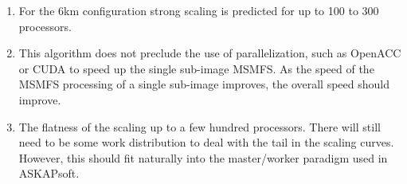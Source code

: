 \documentclass[11pt,a4paper,variablewidth]{article}
\begin{document}
\begin{enumerate}
	\item For the 6km configuration strong scaling is predicted for up to 100 to 300 processors.
	\item This algorithm does not preclude the use of parallelization, such as OpenACC or CUDA to speed up the single sub-image MSMFS. As the speed of the MSMFS processing of a single sub-image improves, the overall speed should improve. 
	\item The flatness of the scaling up to a few hundred processors. There will still need to be some work distribution to deal with the tail in the scaling curves. However, this should fit naturally into the master/worker paradigm used in ASKAPsoft.
\end{enumerate}


\clearpage 

\end{document}
